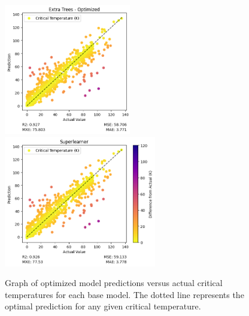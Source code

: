 \documentclass[twocolumn, nofootinbib, secnumarabic, amssymb, nobibnotes, aps, prd]{revtex4-2}
\begin{document}
\begin{figure}[t]
   \includegraphics[height=2.25in]{images/subfigures/no_uncertainty/extra_trees_optimized.png}
   \includegraphics[height=2.25in]{images/subfigures/no_uncertainty/superlearner.png}
   \caption{Graph of optimized model predictions versus actual critical temperatures for each base model. The dotted line represents the optimal prediction for any given critical temperature.}
   \label{fig:results}
\end{figure}%
\end{document}

